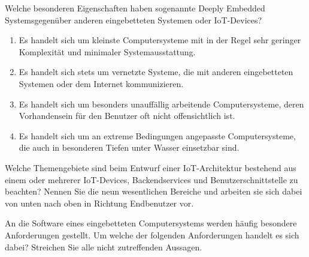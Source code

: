 \teilaufgabe
Welche besonderen Eigenschaften haben sogenannte \glqq Deeply Embedded Systems\grqq gegenüber
anderen eingebetteten Systemen oder IoT-Devices?

\begin{enumerate}
    \item Es handelt sich um kleinste Computersysteme mit in der Regel sehr
    geringer Komplexität und minimaler Systemausstattung.

    \item Es handelt sich stets um vernetzte Systeme, die mit anderen eingebetteten
    Systemen oder dem Internet kommunizieren.

    \item Es handelt sich um besonders unauffällig arbeitende Computersysteme,
    deren Vorhandensein für den Benutzer oft nicht offensichtlich ist.

    \item Es handelt sich um an extreme Bedingungen angepasste Computersysteme,
    die auch in besonderen Tiefen unter Wasser einsetzbar sind.
\end{enumerate}

\teilaufgabe
Welche Themengebiete sind beim Entwurf einer IoT-Architektur bestehend aus einem
oder mehrerer IoT-Devices, Backendservices und Benutzerschnittstelle zu beachten?
Nennen Sie die neun wesentlichen Bereiche und arbeiten sie sich dabei von unten
nach oben in Richtung Endbenutzer vor.

\bigskip
\teilaufgabe
An die Software eines eingebetteten Computersystems werden häufig besondere
Anforderungen gestellt. Um welche der folgenden Anforderungen handelt es sich
dabei? Streichen Sie alle nicht zutreffenden Aussagen.

